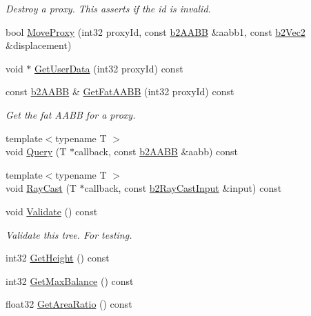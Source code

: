 \begin{DoxyCompactItemize}
\begin{DoxyCompactList}\small\item\em Destroy a proxy. This asserts if the id is invalid. \end{DoxyCompactList}\item 
bool \hyperlink{classb2_dynamic_tree_a7748252811f3c575015931399cbe4daa}{Move\-Proxy} (int32 proxy\-Id, const \hyperlink{structb2_a_a_b_b}{b2\-A\-A\-B\-B} \&aabb1, const \hyperlink{structb2_vec2}{b2\-Vec2} \&displacement)
\item 
void $\ast$ \hyperlink{classb2_dynamic_tree_a44ab57dce3c42b0a5847a64e489a71ce}{Get\-User\-Data} (int32 proxy\-Id) const 
\item 
\hypertarget{classb2_dynamic_tree_adf4676b1c34a57b4451bcbeaebe65687}{const \hyperlink{structb2_a_a_b_b}{b2\-A\-A\-B\-B} \& \hyperlink{classb2_dynamic_tree_adf4676b1c34a57b4451bcbeaebe65687}{Get\-Fat\-A\-A\-B\-B} (int32 proxy\-Id) const }\label{classb2_dynamic_tree_adf4676b1c34a57b4451bcbeaebe65687}

\begin{DoxyCompactList}\small\item\em Get the fat A\-A\-B\-B for a proxy. \end{DoxyCompactList}\item 
{\footnotesize template$<$typename T $>$ }\\void \hyperlink{classb2_dynamic_tree_adf70aee89b4692fc79d65b1f54308585}{Query} (T $\ast$callback, const \hyperlink{structb2_a_a_b_b}{b2\-A\-A\-B\-B} \&aabb) const 
\item 
{\footnotesize template$<$typename T $>$ }\\void \hyperlink{classb2_dynamic_tree_abd7a5c6a5bc109dbbdb0ec3aae039648}{Ray\-Cast} (T $\ast$callback, const \hyperlink{structb2_ray_cast_input}{b2\-Ray\-Cast\-Input} \&input) const 
\item 
\hypertarget{classb2_dynamic_tree_abfac96c615b08406cba3e53b39800f1c}{void \hyperlink{classb2_dynamic_tree_abfac96c615b08406cba3e53b39800f1c}{Validate} () const }\label{classb2_dynamic_tree_abfac96c615b08406cba3e53b39800f1c}

\begin{DoxyCompactList}\small\item\em Validate this tree. For testing. \end{DoxyCompactList}\item 
int32 \hyperlink{classb2_dynamic_tree_add7e09cdf279e7c0031da9dfd4cdf4db}{Get\-Height} () const 
\item 
int32 \hyperlink{classb2_dynamic_tree_ae02c45d1a68b42e59d170438ddbb7977}{Get\-Max\-Balance} () const 
\item 
\hypertarget{classb2_dynamic_tree_ad78282a720c451e032b43c34cba02f1a}{float32 \hyperlink{classb2_dynamic_tree_ad78282a720c451e032b43c34cba02f1a}{Get\-Area\-Ratio} () const }\label{classb2_dynamic_tree_ad78282a720c451e032b43c34cba02f1a}


\end{DoxyCompactItemize}
